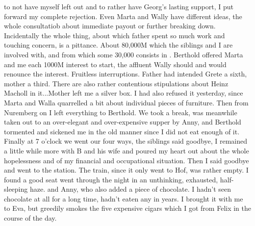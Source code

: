 to not have myself left out and to rather have Georg's lasting support, I put forward my complete rejection. Even Marta and Wally have different ideas, the whole consultatiob about immediate payout or further  breaking down. Incidentally the whole thing, about which father spent so much work and touching concern, is a pittance. About 80,000M which the siblings and I are involved with, and from which some 30,000 consists in . Berthold offered Marta and me each 1000M interest to start, the affluent Wally should and would renounce the interest. Fruitless interruptions. Father had intended Grete a sixth, mother a third. There are also rather contentious stipulations about Heinz Macholl in it...Mother left me a silver box. I had also refused it yesterday, since Marta and Walla quarrelled a bit about individual pieces of furniture. Then from Nuremberg on I left everything to Berthold. We took a break, was meanwhile taken out to an over-elegant and over-expensive supper by Anny, and Berthold tormented and sickened me in the old manner since I did not eat enough of it. Finally at 7 o'clock we went our four ways, the siblings said goodbye, I remained a little while more with B and his wife and poured my heart out about the whole hopelessness and  of my financial and occupational situation. Then I said goodbye and went to the station. The train, since it only went to Hof, was rather empty. I found a good seat went through the night in an unthinking, exhausted, half-sleeping haze.  and Anny, who also added a piece of chocolate. I hadn't seen chocolate at all for a long time, hadn't eaten any in years. I brought it with me to Eva, but greedily smokes the five expensive cigars which I got from Felix in the course of the day. \missing

